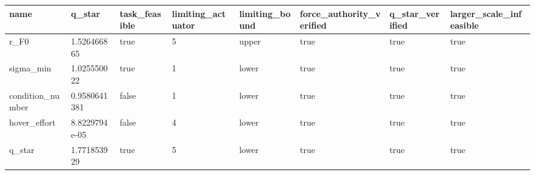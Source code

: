 \begin{tabular}{@{}llllllll@{}}
\toprule
name & q\_star & task\_feasible & limiting\_actuator & limiting\_bound & force\_authority\_verified & q\_star\_verified & larger\_scale\_infeasible \\
\midrule
r\_F0 & 1.526466865 & true & 5 & upper & true & true & true \\
sigma\_min & 1.025550022 & true & 1 & lower & true & true & true \\
condition\_number & 0.9580641381 & false & 1 & lower & true & true & true \\
hover\_effort & 8.8229794e-05 & false & 4 & lower & true & true & true \\
q\_star & 1.771853929 & true & 5 & lower & true & true & true \\
\bottomrule
\end{tabular}
